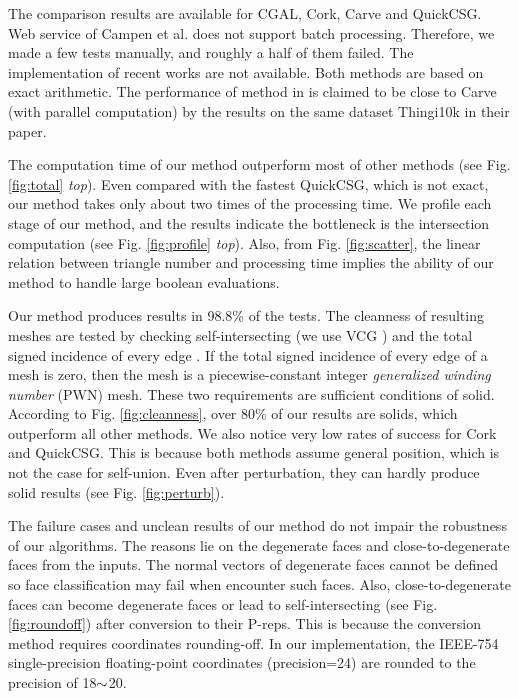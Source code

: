 The comparison results are available for CGAL, Cork, Carve and QuickCSG. Web service of Campen et al. \cite{campen2010exact,WebBSP} does not support batch processing. Therefore, we made a few tests manually, and roughly a half of them failed. The implementation of recent works \cite{zhou2016mesh,barki2015exact} are not available. Both methods are based on exact arithmetic. The performance of method in \cite{zhou2016mesh} is claimed to be close to Carve (with parallel computation) by the results on the same dataset Thingi10k in their paper.

The computation time of our method outperform most of other methods (see Fig. \ref{fig:total} \emph{top}). Even compared with the fastest QuickCSG, which is not exact, our method takes only about two times of the processing time. We profile each stage of our method, and the results indicate the bottleneck is the intersection computation (see Fig. \ref{fig:profile} \emph{top}). Also, from Fig. \ref{fig:scatter}, the linear relation between triangle number and processing time implies the ability of our method to handle large boolean evaluations.

Our method produces results in 98.8\% of the tests. The cleanness of resulting meshes are tested by checking self-intersecting (we use VCG \cite{VCG}) and the total signed incidence of every edge \cite{zhou2016mesh}. If the total signed incidence of every edge of a mesh is zero, then the mesh is a piecewise-constant
integer \emph{generalized winding number} (PWN) \cite{zhou2016mesh} mesh. These two requirements are sufficient conditions of solid. According to Fig. \ref{fig:cleanness}, over 80\% of our results are solids, which outperform all other methods. We also notice very low rates of success for Cork and QuickCSG. This is because both methods assume general position, which is not the case for self-union. Even after perturbation, they can hardly produce solid results (see Fig. \ref{fig:perturb}).

The failure cases and unclean results of our method do not impair the robustness of our algorithms. The reasons lie on the degenerate faces and close-to-degenerate faces from the inputs. The normal vectors of degenerate faces cannot be defined so face classification may fail when encounter such faces. Also, close-to-degenerate faces can become degenerate faces or lead to self-intersecting (see Fig. \ref{fig:roundoff}) after conversion to their P-reps. This is because the conversion method \cite{campen2010exact} requires coordinates rounding-off. In our implementation, the IEEE-754 single-precision floating-point coordinates (precision=24) are rounded to the precision of 18$\scriptsize{\sim}$20.

